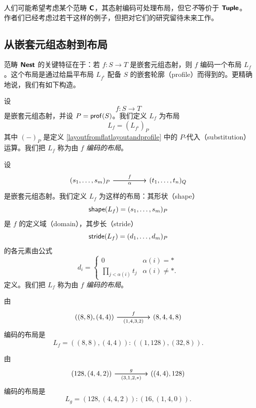 \begin{remark}
    人们可能希望考虑某个范畴 ${\boldsymbol{\mathsf{C}}}$，其态射编码可处理布局，但它{\it 不}等价于 ${\boldsymbol{\mathsf{Tuple}}}$。作者们已经考虑过若干这样的例子，但把对它们的研究留待未来工作。
\end{remark}

\subsection{从嵌套元组态射到布局}

范畴 ${\boldsymbol{\mathsf{Nest}}}$ 的关键特征在于：若 $f:S \to T$ 是嵌套元组态射，则 $f$ 编码一个布局 $L_f$。这个布局是通过给扁平布局 $L_{f^\flat}$ 配备 $S$ 的嵌套轮廓（profile）而得到的。更精确地说，我们有如下构造。

\begin{construction}\label{layoutfromnestedtuplemorphismprofile}
    设
    \[
    f:S \to T
    \]
    是嵌套元组态射，并设 $P = \mathsf{prof}(S)$。我们定义 $L_f$
    为布局
    \[
    L_f = (L_{f^\flat})_P
    \]
    其中 $(-)_P$ 是定义 \ref{layoutfromflatlayoutandprofile} 中的 $P$-代入（substitution）运算。我们把 $L_{f}$ 称为由 $f$ {\it 编码的布局}。
\end{construction}

\begin{construction}\label{layoutfromnestedtuplemorphism}
    设
\[\begin{tikzcd} (s_1,\dots,s_m)_P \ar[rr,"f"] \ar[rr,swap,"\alpha"] & &  (t_1,\dots,t_n)_Q\end{tikzcd} \]
是嵌套元组态射。我们定义 $L_f$ 为这样的布局：其形状（shape）\[\mathsf{shape}(L_f) = (s_1,\dots,s_m)_P\]
是 $f$ 的定义域（domain），其步长（stride）\[\mathsf{stride}(L_f) = (d_1,\dots,d_m)_P\] 的各元素由公式
\[d_i = \begin{cases}
0 & \alpha(i) = * \\
\prod_{j < \alpha(i)} t_j & \alpha(i) \neq *.
\end{cases}
\]
定义。我们把 $L_f$ 称为由 $f$ {\it 编码的布局}。
\end{construction}

\begin{example}
    由
    \[ \begin{tikzcd}
    ((8,8),(4,4)) \ar[rr,"f"] \ar[rr,swap,"(1{,}4{,}3{,}2)"] & & (8,4,4,8)
    \end{tikzcd} \]
    编码的布局是
    \[
    L_f = ((8,8),(4,4)):((1,128),(32,8)).
    \]
\end{example}

\begin{example}
    由
    \[ \begin{tikzcd}
    (128,(4,4,2)) \ar[rr,"g"] \ar[rr,swap,"(3{,}1{,}2{,}*)"] & & ((4,4),128)
    \end{tikzcd} \]
    编码的布局是
    \[
    L_g = (128,(4,4,2)):(16,(1,4,0)).
    \]
\end{example}


